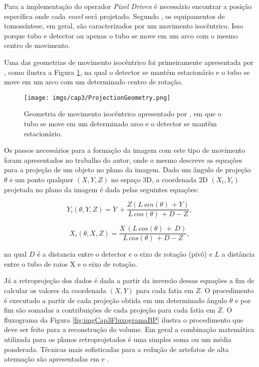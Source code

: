 Para a implementação do operador \textit{Pixel Driven} é necessário encontrar a posição específica onde cada \textit{voxel} será projetado. Segundo , os equipamentos de tomossíntese, em geral, são caracterizados por um movimento isocêntrico. Isso porque tubo e detector ou apenas o tubo se move em um arco com o mesmo centro de movimento. 

Uma das geometrias de movimento isocêntrico foi primeiramente apresentada por , como ilustra a Figura \ref{fig:imgCap3ProjectionGeometry}, na qual o detector se mantém estacionário e o tubo se move em um arco com um determinado centro de rotação. 

\begin{figure}[htb]
	\caption{Geometria de movimento isocêntrico apresentado por , em que o tubo se move em um determinado arco e o detector se mantêm estacionário.}
	\begin{center}
		\texttt{[image: imgs/cap3/ProjectionGeometry.png]}
	\end{center}
	\label{fig:imgCap3ProjectionGeometry}
\end{figure}

Os passos necessários para a formação da imagem com este tipo de movimento foram apresentados no trabalho do autor, onde o mesmo descreve as equações para a projeção de um objeto no plano da imagem. Dado um ângulo de projeção $\theta$ e um ponto qualquer $(X,Y,Z)$ no espaço \acs{3D}, a coordenada \acs{2D} $(X_{i},Y_{i})$ projetada no plano da imagem é dada pelas seguintes equações:

\begin{equation}
Y_{i}(\theta,Y,Z) = Y \, + \dfrac{ Z(L \, sin(\theta) \, + Y)}{L \, cos(\theta) \, + D - Z},
\label{eq:eqCap3ProjectionY}
\end{equation} 

\begin{equation}
X_{i}(\theta,X,Z) = \dfrac{X \, (L \, cos(\theta)\,+\, D)}{L \, cos(\theta) \, + D - Z},
\label{eq:eqCap3ProjectionX}
\end{equation} 

\noindent na qual $D$ é a distancia entre o detector e o eixo de rotação (pivô) e $L$ a distância entre o tubo de raios X e o eixo de rotação.

Já a retroprojeção dos dados é dada a partir da inversão dessas equações a fim de calcular os valores da coordenada $(X,Y)$ para cada fatia em $Z$. O procedimento é executado a partir de cada projeção obtida em um determinado ângulo $\theta$ e por fim são somadas a contribuições de cada projeção para cada fatia em $Z$. O fluxograma da Figura \ref{fig:imgCap3FluxogramaBP} ilustra o procedimento que deve ser feito para a reconstrução do volume. Em geral a combinação matemática utilizada para os planos retroprojetados é uma simples soma ou um média ponderada. Técnicas mais sofisticadas para a redução de artefatos de alta atenuação são apresentadas em  e .

